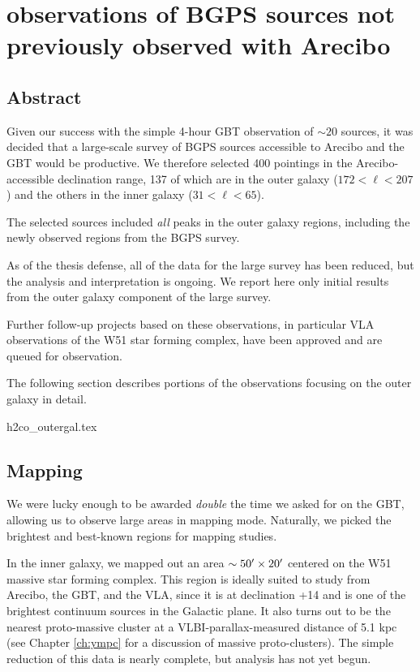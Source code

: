 
\chapter{\formaldehyde observations of BGPS sources not previously observed with Arecibo}


\section{Abstract} 

Given our success with the simple 4-hour GBT observation of $\sim20$ sources,
it was decided that a large-scale survey of BGPS sources accessible to Arecibo
and the GBT would be productive.  We therefore selected 400 pointings in the
Arecibo-accessible declination range, 137 of which are in the outer galaxy
($172<\ell<207$) and the others in the inner galaxy ($31<\ell<65$).

The selected sources included \emph{all} peaks in the outer galaxy regions,
including the newly observed regions from the BGPS \vtwo survey.

As of the thesis defense, all of the data for the large survey has been reduced,
but the analysis and interpretation is ongoing.  We report here only initial
results from the outer galaxy component of the large survey.

Further follow-up projects based on these observations, in particular VLA
observations of the W51 star forming complex, have been approved and are
queued for observation.

The following section describes portions of the \formaldehyde observations focusing
on the outer galaxy in detail.

{h2co_outergal.tex}


\section{\formaldehyde Mapping}
We were lucky enough to be awarded \emph{double} the time we asked for on the GBT,
allowing us to observe large areas in mapping mode.  
Naturally, we picked the brightest and best-known regions for mapping studies.

In the inner galaxy, we mapped out an area $\sim50\mbox{$^\prime$}\times20\mbox{$^\prime$}$ centered
on the W51 massive star forming complex.  This region is ideally suited to study from Arecibo,
the GBT, and the VLA, since it is at declination +14 and is one of the brightest continuum
sources in the Galactic plane.  It also turns out to be the nearest proto-massive cluster
at a VLBI-parallax-measured distance of 5.1 kpc (see Chapter \ref{ch:ympc} for a discussion
of massive proto-clusters).  The simple reduction of this data is nearly complete, but 
analysis has not yet begun.

